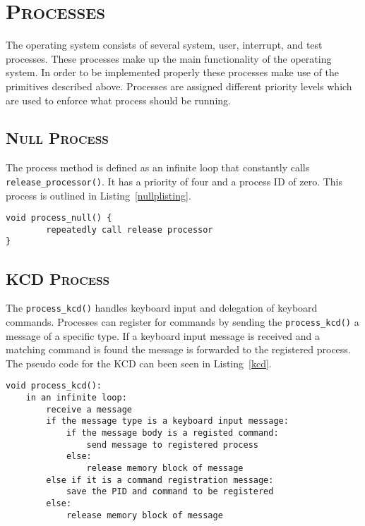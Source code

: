 \documentclass[oneside]{report}
\begin{document}
\section{\textsc{Processes}}
The operating system consists of several system, user, interrupt, and test 
processes. These processes make up the main functionality of the operating 
system. In order to be implemented properly these processes make use of the 
primitives described above. Processes are assigned different priority levels 
which are used to enforce what process should be running.
\subsection{\textsc{Null Process}}
The process method is defined as an infinite loop that constantly calls 
\texttt{release\_processor()}. It has a priority of four and a process ID of 
zero. This process is outlined in Listing~\ref{nullplisting}.

\begin{lstlisting}
void process_null() {
        repeatedly call release processor
}
\end{lstlisting}

\subsection{\textsc{KCD Process}}
The \texttt{process\_kcd()} handles keyboard input and delegation of keyboard 
commands. Processes can register for commands by sending the 
\texttt{process\_kcd()} a message of a specific type. If a keyboard input 
message is received and a matching command is found the message is forwarded to 
the registered process. The pseudo code for the KCD can been seen in 
Listing~\ref{kcd}.

\begin{lstlisting}
void process_kcd():
    in an infinite loop:
        receive a message
        if the message type is a keyboard input message:
            if the message body is a registed command:
                send message to registered process
            else:
                release memory block of message
        else if it is a command registration message:
            save the PID and command to be registered
        else:
            release memory block of message
\end{lstlisting}
\end{document}
